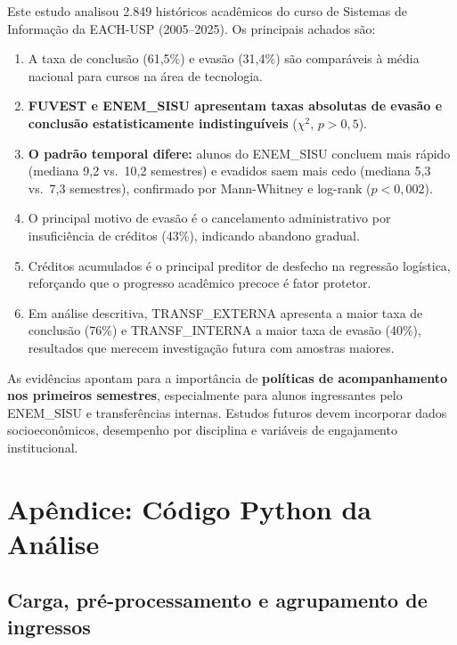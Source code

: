 \documentclass[12pt, a4paper]{article}
\begin{document}
Este estudo analisou 2.849 históricos acadêmicos do curso de Sistemas de
Informação da EACH-USP (2005--2025). Os principais achados são:

\begin{enumerate}
  \item A taxa de conclusão (61,5\%) e evasão (31,4\%) são comparáveis
    à média nacional para cursos na área de tecnologia.
  \item \textbf{FUVEST e ENEM\_SISU apresentam taxas absolutas de evasão e
    conclusão estatisticamente indistinguíveis} ($\chi^2$, $p > 0{,}5$).
  \item \textbf{O padrão temporal difere:} alunos do ENEM\_SISU concluem
    mais rápido (mediana 9,2 vs.\ 10,2 semestres) e evadidos saem mais cedo
    (mediana 5,3 vs.\ 7,3 semestres), confirmado por Mann-Whitney e
    log-rank ($p < 0{,}002$).
  \item O principal motivo de evasão é o cancelamento administrativo por
    insuficiência de créditos (43\%), indicando abandono gradual.
  \item Créditos acumulados é o principal preditor de desfecho na regressão
    logística, reforçando que o progresso acadêmico precoce é fator protetor.
  \item Em análise descritiva, TRANSF\_EXTERNA apresenta a maior taxa de
    conclusão (76\%) e TRANSF\_INTERNA a maior taxa de evasão (40\%),
    resultados que merecem investigação futura com amostras maiores.
\end{enumerate}

As evidências apontam para a importância de \textbf{políticas de acompanhamento
nos primeiros semestres}, especialmente para alunos ingressantes pelo
ENEM\_SISU e transferências internas. Estudos futuros devem incorporar dados
socioeconômicos, desempenho por disciplina e variáveis de engajamento
institucional.

\section*{Apêndice: Código Python da Análise}

\subsection*{Carga, pré-processamento e agrupamento de ingressos}
\end{document}

